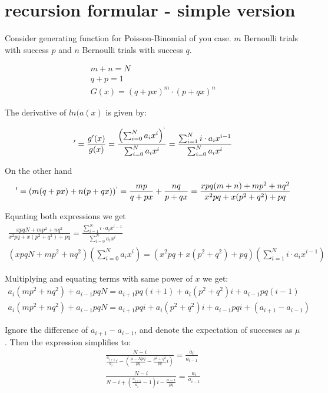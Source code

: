 \documentclass[11pt,draft]{article}
\title{}
\author{Maxim Zhilyaev \and David Zeber}
\begin{document}
\maketitle

\section{recursion formular - simple version}

Consider generating function for Poisson-Binomial of you case.  $m$ Bernoulli trials with success $p$ and $n$ Bernoulli trials with success $q$. 

\begin{align}
m+n = N \\
q+p = 1 \\
G(x) = (q+px)^m \cdot (p+qx)^n
\end{align}

The derivative of $ln(a(x)$ is given by:

\begin{align}
[ln(g(x)]' = \frac{g'(x)}{g(x)} = \frac{\left ( \sum_{i=0}^{N} a_i x^i \right )^`}{ \sum_{i=0}^{N} a_i x^i} = \frac{\sum_{i=1}^{N} i \cdot a_i x^{i-1}}{  \sum_{i=0}^{N} a_i x^i}
\end{align}

On the other hand
\begin{align}
[ln(g(x))]' = (m(q+px) + n(p+qx))^` = \frac{mp}{q+px} + \frac{nq}{p+qx} = \frac{xpq(m+n) + mp^2 + nq^2}{x^2pq + x(p^2 + q^2) + pq}
\end{align}

Equating both expressions we get
\begin{align}
\frac{xpqN + mp^2 + nq^2}{x^2pq + x(p^2 + q^2) + pq} = \frac{\sum_{i=1}^{N} i \cdot a_i x^{i-1}}{  \sum_{i=0}^{N} a_i x^i} \\
(xpqN + mp^2 + nq^2)(\sum_{i=0}^{N} a_i x^i) = (x^2pq + x(p^2 + q^2) + pq)(\sum_{i=1}^{N} i \cdot a_i x^{i-1})
\end{align}

Multiplying and equating terms with same power of $x$ we get:
\begin{align}
a_i(mp^2 + nq^2) + a_{i-1}pqN = a_{i+1}pq(i+1) + a_i(p^2 + q^2)i + a_{i-1}pq(i-1) \\
a_i(mp^2 + nq^2) + a_{i-1}pqN = a_{i+1}pqi + a_i(p^2 + q^2)i + a_{i-1}pqi  + (a_{i+1} - a_{i-1})
\end{align}

Ignore the difference of $a_{i+1} - a_{i-1}$, and denote the expectation of successes as $\mu$. Then the expression simplifies to:
\begin{align}
\frac{   N - i}{ \frac{ a_{i+1}}{a_i}i    - (\frac{\mu - Npq}{pq} - \frac{p^2 + q^2}{pq}i)   } =  \frac{a_{i}}{a_{i-1}} \\
\frac{   N - i}{ N - i  + (\frac{ a_{i+1}}{a_i} - 1)i   - \frac{\mu - i}{pq}   } =  \frac{a_{i}}{a_{i-1}} \\
\end{align}
\end{document}
